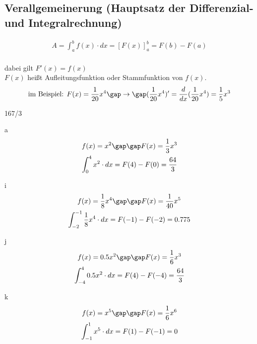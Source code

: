 \subsection{Verallgemeinerung (Hauptsatz der Differenzial- und Integralrechnung)}
\begin{gather*}
  A = \int_a^b f(x) \cdot dx = \left[F(x)\right]_a^b = F(b) - F(a)
\end{gather*} \\
dabei gilt $F'(x) = f(x)$ \\
$F(x)$ heißt Aufleitungsfunktion oder Stammfunktion von $f(x)$.
\begin{gather*}
  \text{im Beispiel: } F(x) = \frac{1}{20}x^4 \gap\rightarrow\gap (\frac{1}{20}x^4)' = \frac{d}{dx}(\frac{1}{20}x^4) = \frac{1}{5}x^3
\end{gather*}
\begin{exercise}{167/3}
  \item [a]
  \begin{gather*}
    f(x) = x^2 \gap\gap F(x) = \frac{1}{3}x^3 \\
    \int_0^4 x^2 \cdot dx = F(4) - F(0) = \frac{64}{3}
  \end{gather*}
  \item [i]
  \begin{gather*}
    f(x) = \frac{1}{8}x^4 \gap\gap F(x) = \frac{1}{40}x^5 \\
    \int_{-2}^{-1} \frac{1}{8}x^4 \cdot dx = F(-1) - F(-2) = 0.775
  \end{gather*}
  \item [j]
  \begin{gather*}
    f(x) = 0.5x^2 \gap\gap F(x) = \frac{1}{6}x^3 \\
    \int_{-4}^4 0.5x^2 \cdot dx = F(4) - F(-4) = \frac{64}{3}
  \end{gather*}
  \item [k]
  \begin{gather*}
    f(x) = x^5 \gap\gap F(x) = \frac{1}{6}x^6 \\
    \int_{-1}^1 x^5 \cdot dx = F(1) - F(-1) = 0
  \end{gather*}
\end{exercise}
